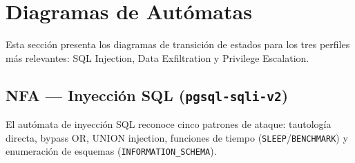 \documentclass[12pt, a4paper]{report}
\theoremstyle{definition}
\theoremstyle{remark}
\begin{document}
\chapter{Diagramas de Autómatas}

Esta sección presenta los diagramas de transición de estados para los tres
perfiles más relevantes: SQL Injection, Data Exfiltration y Privilege Escalation.

\section{NFA — Inyección SQL (\texttt{pgsql-sqli-v2})}

El autómata de inyección SQL reconoce cinco patrones de ataque:
tautología directa, bypass OR, UNION injection, funciones de tiempo
(\texttt{SLEEP}/\texttt{BENCHMARK}) y enumeración de esquemas
(\texttt{INFORMATION\_SCHEMA}).
\end{document}
